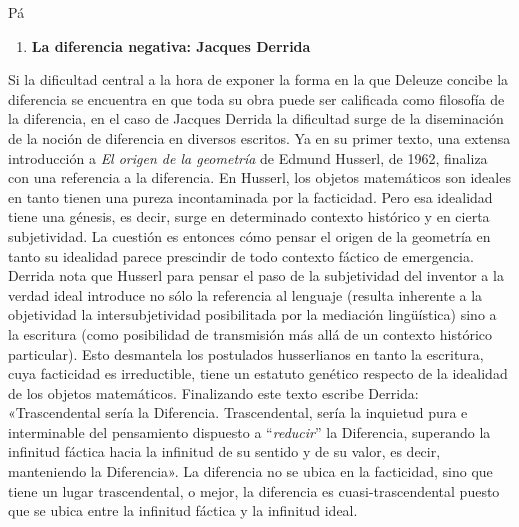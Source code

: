 Pá

\begin{enumerate}
\def\labelenumi{\arabic{enumi}.}
\item
  \textbf{La diferencia negativa: Jacques Derrida}
\end{enumerate}

Si la dificultad central a la hora de exponer la forma en la que Deleuze concibe la diferencia se encuentra en que toda su obra puede ser calificada como filosofía de la diferencia, en el caso de Jacques Derrida la dificultad surge de la diseminación de la noción de diferencia en diversos escritos. Ya en su primer texto, una extensa introducción a \emph{El origen de la geometría }de Edmund Husserl, de 1962, finaliza con una referencia a la diferencia. En Husserl, los objetos matemáticos son ideales en tanto tienen una pureza incontaminada por la facticidad. Pero esa idealidad tiene una génesis, es decir, surge en determinado contexto histórico y en cierta subjetividad. La cuestión es entonces cómo pensar el origen de la geometría en tanto su idealidad parece prescindir de todo contexto fáctico de emergencia. Derrida nota que Husserl para pensar el paso de la subjetividad del inventor a la verdad ideal introduce no sólo la referencia al lenguaje (resulta inherente a la objetividad la intersubjetividad posibilitada por la mediación lingüística) sino a la escritura (como posibilidad de transmisión más allá de un contexto histórico particular). Esto desmantela los postulados husserlianos en tanto la escritura, cuya facticidad es irreductible, tiene un estatuto genético respecto de la idealidad de los objetos matemáticos. Finalizando este texto escribe Derrida: «Trascendental sería la Diferencia. Trascendental, sería la inquietud pura e interminable del pensamiento dispuesto a ``\emph{reducir}'' la Diferencia, superando la infinitud fáctica hacia la infinitud de su sentido y de su valor, es decir, manteniendo la Diferencia». La diferencia no se ubica en la facticidad, sino que tiene un lugar trascendental, o mejor, la diferencia es cuasi-trascendental puesto que se ubica entre la infinitud fáctica y la infinitud ideal.

